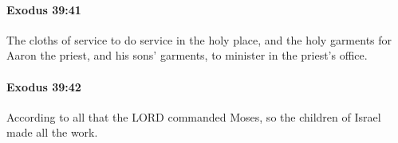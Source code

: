 		\paragraph{Exodus 39:41} %
			\label{EXODUS-39-41}

			The cloths of service to do service in the holy place, and the holy garments for Aaron the priest, and his sons' garments, to minister in the priest's office.


		\paragraph{Exodus 39:42} %
			\label{EXODUS-39-42}

			According to all that the LORD commanded Moses, so the children of Israel made all the work.


